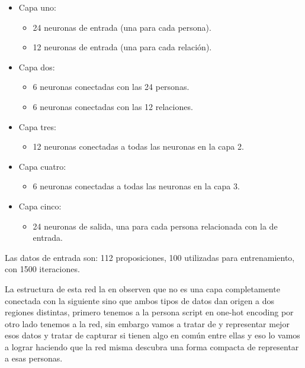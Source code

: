 \begin{itemize}
 \item Capa uno:
 \begin{itemize}
  \item 24 neuronas de entrada (una para cada persona).
  \item 12 neuronas de entrada (una para cada relación).
 \end{itemize}
\item Capa dos:
 \begin{itemize}
  \item 6 neuronas conectadas con las 24 personas.
  \item 6 neuronas conectadas con las 12 relaciones.
 \end{itemize}
\item Capa tres:
 \begin{itemize}
  \item 12 neuronas conectadas a todas las neuronas en la capa 2.
 \end{itemize}
\item Capa cuatro:
 \begin{itemize}
  \item 6 neuronas conectadas a todas las neuronas en la capa 3.
 \end{itemize}
\item Capa cinco:
 \begin{itemize}
  \item 24 neuronas de salida, una para cada persona relacionada con la de entrada.
 \end{itemize}

\end{itemize}

Las datos de entrada son: 112 proposiciones, 100 utilizadas para entrenamiento, con 1500 iteraciones.

 La estructura de esta red la  en observen que no es una capa completamente conectada con la siguiente sino que ambos tipos de datos dan origen a dos regiones distintas, primero tenemos a la persona script en one-hot encoding por otro lado tenemos a la red, sin embargo vamos a tratar de y representar mejor esos datos y tratar de capturar si tienen algo en común entre ellas y eso lo vamos a lograr haciendo que la red misma descubra una forma compacta de representar a esas personas. 

